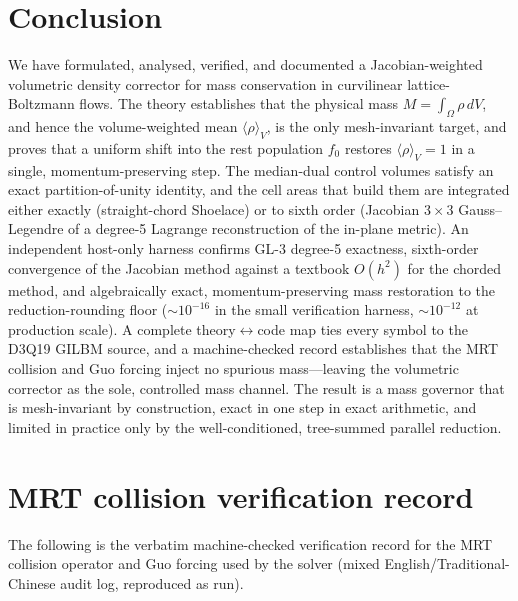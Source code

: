 \documentclass[11pt]{article}
\theoremstyle{definition}
\theoremstyle{remark}
\begin{document}
\section{Conclusion}
\label{sec:conclusion}

We have formulated, analysed, verified, and documented a Jacobian-weighted
volumetric density corrector for mass conservation in curvilinear lattice-Boltzmann
flows. The theory establishes that the physical mass $M=\int_\Omega\rho\,dV$, and
hence the volume-weighted mean $\langle\rho\rangle_V$, is the only mesh-invariant
target, and proves that a uniform shift into the rest population $f_0$ restores
$\langle\rho\rangle_V=1$ in a single, momentum-preserving step. The median-dual
control volumes satisfy an exact partition-of-unity identity, and the cell areas
that build them are integrated either exactly (straight-chord Shoelace) or to sixth
order (Jacobian $3\times3$ Gauss--Legendre of a degree-5 Lagrange reconstruction of
the in-plane metric). An independent host-only harness confirms GL-3 degree-5
exactness, sixth-order convergence of the Jacobian method against a textbook
$O(h^2)$ for the chorded method, and algebraically exact, momentum-preserving mass
restoration to the reduction-rounding floor ($\sim\!10^{-16}$ in the small
verification harness, $\sim\!10^{-12}$ at production scale). A complete
theory$\leftrightarrow$code map ties
every symbol to the D3Q19 GILBM source, and a machine-checked record establishes
that the MRT collision and Guo forcing inject no spurious mass---leaving the
volumetric corrector as the sole, controlled mass channel. The result is a mass
governor that is mesh-invariant by construction, exact in one step in exact
arithmetic, and limited in practice only by the well-conditioned, tree-summed
parallel reduction.

\appendix
\section{MRT collision verification record}
\label{app:mrt}

The following is the verbatim machine-checked verification record for the MRT
collision operator and Guo forcing used by the solver (mixed
English/Traditional-Chinese audit log, reproduced as run).
\end{document}
